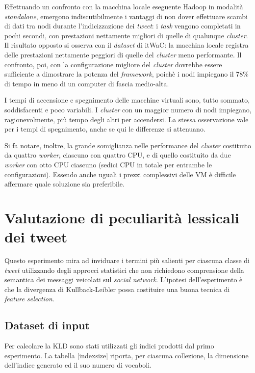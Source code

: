 Effettuando un confronto con la macchina locale eseguente Hadoop in modalità \textit{standalone}, emergono indiscutibilmente i vantaggi di non dover effettuare scambi di dati tra nodi 
durante l’indicizzazione dei \textit{tweet}: i \textit{task} vengono completati in pochi secondi, con prestazioni nettamente migliori di quelle di qualunque \textit{cluster}.
Il risultato opposto si osserva con il \textit{dataset} di itWaC: la macchina locale registra delle prestazioni nettamente peggiori di quelle del \textit{cluster} meno performante.
Il confronto, poi, con la configurazione migliore del \textit{cluster} dovrebbe essere sufficiente a dimostrare la potenza del \textit{framework}, poichè i nodi impiegano il 78\% di tempo in meno di 
un computer di fascia medio-alta.

I tempi di accensione e spegnimento delle macchine virtuali sono, tutto sommato, soddisfacenti e poco variabili.
I \textit{cluster} con un maggior numero di nodi impiegano, ragionevolmente, più tempo degli altri per accendersi. 
La stessa osservazione vale per i tempi di spegnimento, anche se qui le differenze si attenuano.

Si fa notare, inoltre, la grande somiglianza nelle performance del \textit{cluster} costituito da quattro \textit{worker}, ciascuno con quattro CPU, e di quello costituito da due \textit{worker} 
con otto CPU ciascuno (sedici CPU in totale per entrambe le configurazioni). Essendo anche uguali i prezzi complessivi delle VM è difficile affermare quale soluzione sia preferibile.


\section{Valutazione di peculiarità lessicali dei tweet}

Questo esperimento mira ad inviduare i termini più salienti per ciascuna classe di \textit{tweet} utilizzando degli approcci statistici che non richiedono comprensione della
semantica dei messaggi veicolati sul \textit{social network}. L'ipotesi dell'esperimento è che la divergenza di Kullback-Leibler possa costituire una buona tecnica di \textit{feature selection}.


\subsection{Dataset di input}
\label{esptweet:dataset}

Per calcolare la KLD sono stati utilizzati gli indici prodotti dal primo esperimento. La tabella \ref{indexsize} riporta, per ciascuna collezione, la dimensione dell'indice generato ed il suo numero di vocaboli.

